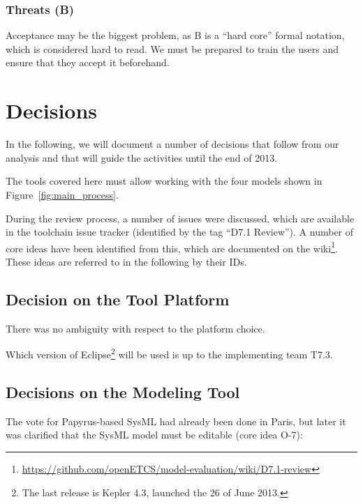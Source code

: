 \subsubsection{Threats (B)}

Acceptance may be the biggest problem, as B is a ``hard core'' formal notation, which is considered hard to read.  We must be prepared to train the users and ensure that they accept it beforehand.

\section{Decisions}
\label{sec:dec}

In the following, we will document a number of decisions that follow from our analysis and that will guide the activities until the end of 2013.

The tools covered here must allow working with the four models shown in Figure~\ref{fig:main_process}.

During the review process, a number of issues were discussed, which are available in the toolchain issue tracker (identified by the tag ``D7.1 Review'').  A number of core ideas have been identified from this, which are documented on the wiki\footnote{\url{https://github.com/openETCS/model-evaluation/wiki/D7.1-review}}.  These ideas are referred to in the following by their IDs.

\subsection{Decision on the Tool Platform}
\label{sec:decision_platform}

There was no ambiguity with respect to the platform choice.


 Which version of Eclipse\footnote{The last release is Kepler 4.3, launched the 26 of June 2013.} will be used is up to the implementing team T7.3.

\subsection{Decisions on the Modeling Tool}

The vote for Papyrus-based SysML had already been done in Paris, but later it was clarified that the SysML model must be editable (core idea O-7):

